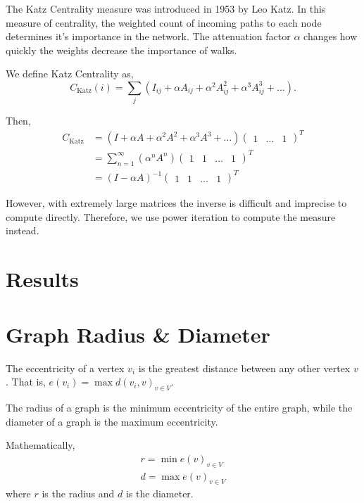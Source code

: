 \documentclass{article}
\begin{document}
The Katz Centrality measure was introduced in 1953 by Leo Katz. 
In this measure of centrality, the weighted count of incoming paths to each node determines it's importance in the network. The attenuation factor $\alpha$ changes how quickly the weights decrease the importance of walks.

We define Katz Centrality as,
\begin{equation*}
    C_{\textrm{Katz}}(i) = \sum_{j} (I_{ij} + \alpha A_{ij} + \alpha^2 A_{ij}^2 + \alpha^3 A_{ij}^3 + \dots).
\end{equation*}

Then,
\begin{align*}
    C_{\textrm{Katz}} &= (I + \alpha A + \alpha^2 A^2 + \alpha^3 A^3 + \dots) \begin{pmatrix}
        1 & \dots & 1
    \end{pmatrix}^T \\
    &= \sum^\infty_{n=1} (\alpha^n A^n)\begin{pmatrix}
    1 & 1 & \dots & 1
\end{pmatrix}^T \\ 
&= (I - \alpha A)^{-1} \begin{pmatrix}
    1 & 1 & \dots & 1
\end{pmatrix}^T 
\end{align*}

However, with extremely large matrices the inverse is difficult and imprecise to compute directly.
Therefore, we use power iteration to compute the measure instead.

\section*{Results}

\section{Graph Radius \& Diameter}

The eccentricity of a vertex $v_i$ is the greatest distance between any other vertex $v$. That is, $e(v_i) = \max d(v_i, v)_{v \in V}$.

The radius of a graph is the minimum eccentricity of the entire graph, while the diameter of a graph is the maximum eccentricity.


Mathematically,
\begin{align*}
    r = \min e(v)_{v \in V} \\
    d = \max e(v)_{v \in V}
\end{align*}
where $r$ is the radius and $d$ is the diameter.
\end{document}
